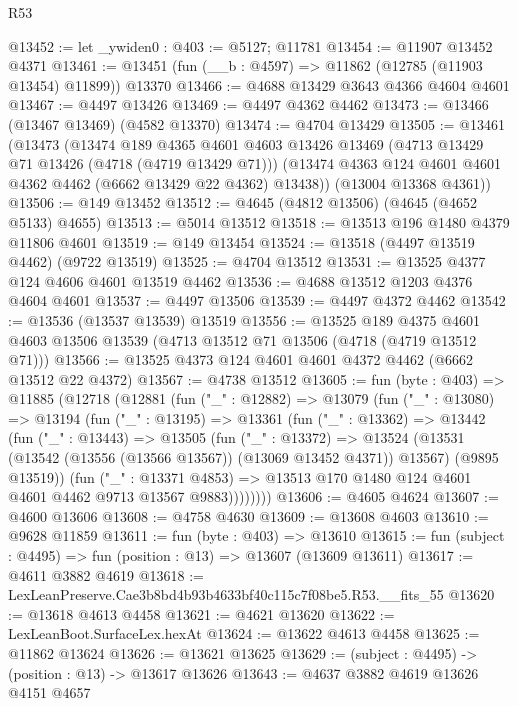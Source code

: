 \begin{lexlean}{R53}
\begin{coremodule}
@13452 := let _ywiden0 : @403 := @5127; @11781
@13454 := @11907 @13452 @4371
@13461 := @13451 (fun (__b : @4597) => @11862 (@12785 (@11903 @13454) @11899)) @13370
@13466 := @4688 @13429 @3643 @4366 @4604 @4601
@13467 := @4497 @13426
@13469 := @4497 @4362 @4462
@13473 := @13466 (@13467 @13469) (@4582 @13370)
@13474 := @4704 @13429
@13505 := @13461
    (@13473
      (@13474
        @189
        @4365
        @4601
        @4603
        @13426
        @13469
        (@4713 @13429 @71 @13426 (@4718 (@4719 @13429 @71)))
        (@13474 @4363 @124 @4601 @4601 @4362 @4462 (@6662 @13429 @22 @4362) @13438))
      (@13004 @13368 @4361))
@13506 := @149 @13452
@13512 := @4645 (@4812 @13506) (@4645 (@4652 @5133) @4655)
@13513 := @5014 @13512
@13518 := @13513 @196 @1480 @4379 @11806 @4601
@13519 := @149 @13454
@13524 := @13518 (@4497 @13519 @4462) (@9722 @13519)
@13525 := @4704 @13512
@13531 := @13525 @4377 @124 @4606 @4601 @13519 @4462
@13536 := @4688 @13512 @1203 @4376 @4604 @4601
@13537 := @4497 @13506
@13539 := @4497 @4372 @4462
@13542 := @13536 (@13537 @13539) @13519
@13556 := @13525
    @189
    @4375
    @4601
    @4603
    @13506
    @13539
    (@4713 @13512 @71 @13506 (@4718 (@4719 @13512 @71)))
@13566 := @13525 @4373 @124 @4601 @4601 @4372 @4462 (@6662 @13512 @22 @4372)
@13567 := @4738 @13512
@13605 := fun (byte : @403) =>
  @11885
    (@12718
      (@12881
        (fun ("_" : @12882) =>
        @13079
          (fun ("_" : @13080) =>
          @13194
            (fun ("_" : @13195) =>
            @13361
              (fun ("_" : @13362) =>
              @13442
                (fun ("_" : @13443) =>
                @13505
                  (fun ("_" : @13372) =>
                  @13524
                    (@13531 (@13542 (@13556 (@13566 @13567)) (@13069 @13452 @4371)) @13567)
                    (@9895 @13519))
                  (fun ("_" : @13371 @4853) =>
                  @13513 @170 @1480 @124 @4601 @4601 @4462 @9713 @13567 @9883))))))))
@13606 := @4605 @4624
@13607 := @4600 @13606
@13608 := @4758 @4630
@13609 := @13608 @4603
@13610 := @9628 @11859
@13611 := fun (byte : @403) => @13610
@13615 := fun (subject : @4495) => fun (position : @13) => @13607 (@13609 @13611)
@13617 := @4611 @3882 @4619
@13618 := LexLeanPreserve.Cae3b8bd4b93b4633bf40c115c7f08be5.R53.__fits_55
@13620 := @13618 @4613 @4458
@13621 := @4621 @13620
@13622 := LexLeanBoot.SurfaceLex.hexAt
@13624 := @13622 @4613 @4458
@13625 := @11862 @13624
@13626 := @13621 @13625
@13629 := (subject : @4495) -> (position : @13) -> @13617 @13626
@13643 := @4637
    @3882
    @4619
    @13626
    @4151
    @4657

\end{coremodule}
\end{lexlean}
